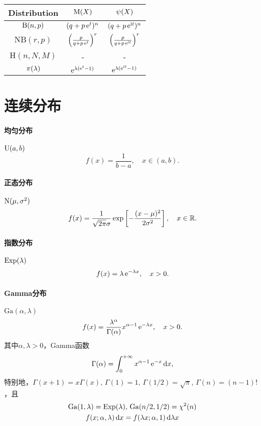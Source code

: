 \begin{center}
	\begin{tabular}{ccc}
		\toprule
		Distribution&$\operatorname{M}(X)$&$\operatorname{\psi}(X)$\\
		\midrule
		$\operatorname{B}(n,p)$&$(q+p\mathop{}\!\mathrm{e}^ t)^n$&$(q+p\mathop{}\!\mathrm{e}^{\mathrm{i} t})^n$\\
		$\mathrm{NB}(r,p)$&$\left(\frac p{q+p\mathop{}\!\mathrm{e}^{t}}\right)^r$&$\left(\frac p{q+p\mathop{}\!\mathrm{e}^{\mathrm{i} t}}\right)^r$\\
		$\mathrm H(n,N,M)$&-&-\\
		$\operatorname{\pi}(\lambda)$&$\mathop{}\!\mathrm{e}^{\lambda(\mathop{}\!\mathrm{e}^ t-1)}$&$\mathop{}\!\mathrm{e}^{\lambda(\mathop{}\!\mathrm{e}^{\mathrm{i} t}-1)}$\\
		\bottomrule
	\end{tabular}
\end{center}

\section{连续分布}

\paragraph{均匀分布}

$\operatorname{U}(a,b)$
\begin{equation}
	f(x)=\frac1{b-a},\quad x\in(a,b).
\end{equation}

\paragraph{正态分布}

$\operatorname{N}(\mu,\sigma^2)$
\begin{equation}
	f(x)=\frac1{\sqrt{2\pi}\sigma}\exp\left[-\frac{(x-\mu)^2}{2\sigma^2}\right],\quad x\in\mathbb R.
\end{equation}

\paragraph{指数分布}

$\operatorname{Exp}(\lambda)$
\begin{equation}
	f(x)=\lambda\mathop{}\!\mathrm{e}^{-\lambda x},\quad x>0.
\end{equation}

\paragraph{Gamma分布}

$\mathrm{Ga}(\alpha,\lambda)$
\begin{equation}
	f(x)=\frac{\lambda^\alpha}{\Gamma(\alpha)}x^{\alpha-1}\mathop{}\!\mathrm{e}^{-\lambda x},\quad x>0.
\end{equation}
其中$\alpha,\lambda>0$，Gamma函数
\[
	\Gamma(\alpha)=\int_0^{+\infty} x^{\alpha-1}\mathop{}\!\mathrm{e}^{-x}\mathop{}\!\mathrm{d} x,
\]
特别地，$\Gamma(x+1)=x\Gamma(x),\,\Gamma(1)=1,\,\Gamma(1/2)=\sqrt\pi,\,\Gamma(n)=(n-1)!$，且
\begin{gather*}
	\mathrm{Ga}(1,\lambda)=\operatorname{Exp}(\lambda),\,\mathrm{Ga}(n/2,1/2)=\chi^2(n)\\
	f(x;\alpha,\lambda)\mathop{}\!\mathrm{d} x=f(\lambda x;\alpha,1)\mathop{}\!\mathrm{d}\lambda x
\end{gather*}


